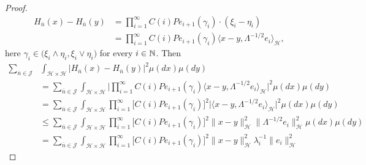 \documentclass[review, onefignum, onetabnum]{siamart171218}
\begin{document}
\begin{proof}
\begin{equation}
\label{s3.6}
\begin{aligned}
    H_{\bar n}(x)-H_{\bar n}(y)&=\prod_{i=1}^\infty C(i)Pe_{i+1}(\gamma_i) 
    \cdot 
    (\xi_i-\eta_i)
    \\
    &= 
    \prod_{i=1}^\infty 
    C(i)Pe_{i+1}(\gamma_i) 
    \langle 
        x-y, \Lambda^{-1/2}e_i
    \rangle_{\mathcal{H}},
 \end{aligned}
\end{equation}
here $\gamma_i\in \big(\xi_i\wedge\eta_i, \xi_i\vee \eta_i  \big)$ 
for every $i\in {\mathbb N}$. 
Then
\begin{equation}
    \label{s3.8}
    \begin{aligned}
        \sum_{\bar n\in \mathcal{J}} 
        &
        \int_{\mathcal{H}\times \mathcal{H}}  
            \big| 
                H_{\bar n}(x) -H_{\bar n}(y) 
            \big|^2 
        \mu(dx)\mu(dy)
        \\ 
        &= 
        \sum_{\bar n\in \mathcal{J}}
            \int_{\mathcal{H}\times \mathcal{H}}  
                \Big| 
                    \prod_{i=1}^\infty C(i)Pe_{i+1}(\gamma_i) 
                    \langle 
                        x-y,
                        \Lambda^{-1/2}e_i
                    \rangle_{\mathcal{H}}  
                \Big|^2
        \mu(dx)\mu(dy)
        \\
        &=
        \sum_{\bar n\in \mathcal{J}} 
        \int_{\mathcal{H}\times \mathcal{H}}  
            \prod_{i=1}^\infty   
            \Big[
                C(i) Pe_{i+1}(\gamma_i)\Big]^2 
            \Big|
                \langle 
                    x-y,\Lambda^{-1/2}e_i
                \rangle_{\mathcal{H}}  
            \Big|^2
            \mu(dx) \mu(dy)
        \\
        &\le 
            \sum_{\bar n\in \mathcal{J}}
            \int_{\mathcal{H} \times \mathcal{H}}  
                \prod_{i=1}^\infty   
                \Big[
                    C(i)Pe_{i+1}(\gamma_i)
                \Big]^2 
                \| x-y\|_{\mathcal{H}}^2
                \|\Lambda^{-1/2} e_i\|_{\mathcal{H}}^2 
            \mu(dx)\mu(dy)
        \\
        &=
            \sum_{\bar n\in \mathcal{J}}
            \int_{\mathcal{H}\times \mathcal{H}}
                \prod_{i=1}^\infty   
                \Big[
                    C(i)Pe_{i+1}(\gamma_i)
                \Big]^2 
                \| x-y\|_{\mathcal{H}}^2
                \lambda_i^{-1} 
                \|e_i\|_{\mathcal{H}}^2 

\end{aligned}
\end{equation}
\end{proof}
\end{document}

